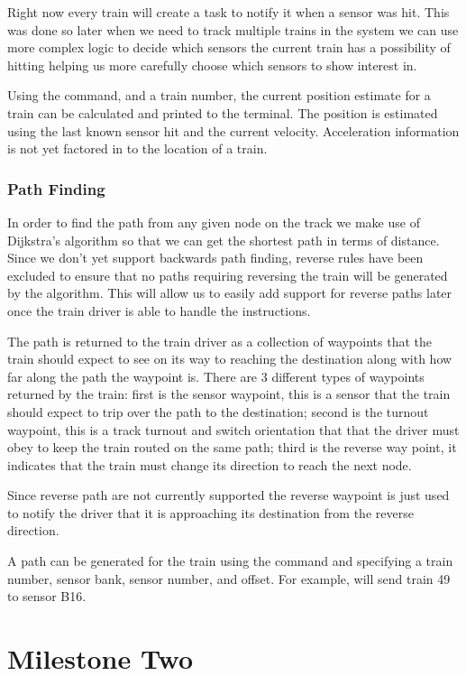 \documentclass[pdftex,10pt,a4paper]{article}
\begin{document}
Right now every train will create a task to notify it when a sensor was hit.
This was done so later when we need to track multiple trains in the system we
can use more complex logic to decide which sensors the current train has a
possibility of hitting helping us more carefully choose which sensors to show
interest in.

Using the  command, and a train number, the current position
estimate for a train can be calculated and printed to the terminal. The
position is estimated using the last known sensor hit and the current
velocity. Acceleration information is not yet factored in to the
location of a train.

\section*{Path Finding}

In order to find the path from any given node on the track we make use of
Dijkstra's algorithm so that we can get the shortest path in terms of distance.
Since we don't yet support backwards path finding, reverse rules have
been excluded to ensure that no paths requiring reversing the train
will be generated by the algorithm. This will allow us to easily add
support for reverse paths later once the train driver is able to
handle the instructions.

The path is returned to the train driver as a collection of waypoints that the
train should expect to see on its way to reaching the destination along with
how far along the path the waypoint is. There are 3 different types of
waypoints returned by the train: first is the sensor waypoint, this is a sensor
that the train should expect to trip over the path to the destination; second
is the turnout waypoint, this is a track turnout and switch orientation that
that the driver must obey to keep the train routed on the same path; third is
the reverse way point, it indicates that the train must change its direction to
reach the next node.

Since reverse path are not currently supported the reverse waypoint is just used
to notify the driver that it is approaching its destination from the reverse
direction.

A path can be generated for the train using the  command and
specifying a train number, sensor bank, sensor number, and offset. For
example,  will send train 49 to sensor B16.


\part*{Milestone Two}
\end{document}
